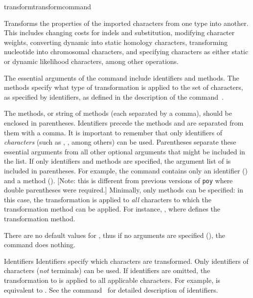 \begin{command}{transform}{transformcommand}


\begin{poydescription} 
Transforms the properties of the imported characters from one type into
another. This includes changing costs for indels and substitution,
modifying character weights, converting dynamic into static homology characters,
transforming nucleotide into chromosomal characters, and specifying characters as either 
static or dynamic likelihood characters, among other operations.

The essential arguments of the command  
include identifiers and methods. The methods
specify what type of transformation is applied to the set of characters,
as specified by identifiers, as defined in the description of the command~.


The methods, or string of methods (each separated by a comma), should be enclosed in 
parentheses. Identifiers precede the methods and are separated from them with a comma.
It is important to remember that only identifiers of \emph{characters} 
(such as , , among
others) can be used. Parentheses separate these essential arguments from all other 
optional arguments that might be included
in the list. If only identifiers and methods are specified,
the argument list of  is included in 
parentheses. For example, the command  
contains only an identifier () and a
method (). [Note: this is different from previous versions of \texttt{poy} 
where double parentheses were required.] Minimally, only methods can be
specified: in this case, the transformation is applied to \emph{all}
characters to which the transformation method can be applied. For instance,
, where
 defines
the transformation method.

There are no default values for , thus if
no arguments are specified (), the command does nothing.
\end{poydescription}

\begin{arguments}

\begin{argumentgroup}{Identifiers}
Identifiers specify which characters are transformed. Only
identifiers of characters (\emph{not} terminals) can be used. If
identifiers are omitted, the transformation to is applied to all
applicable characters. For example,
 is equivalent to
. See the command~
for detailed description of identifiers.
\end{argumentgroup}


\end{arguments}
\end{command}
